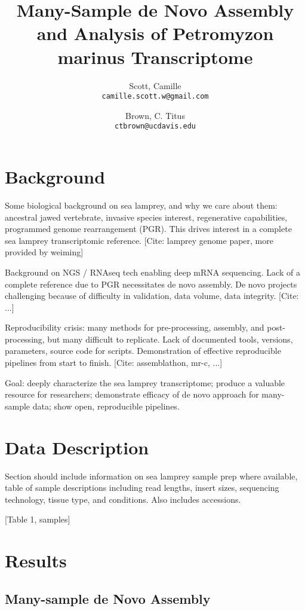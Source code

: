 \documentclass[10pt,twocolumn,linenumbers]{article}
\title{Many-Sample de Novo Assembly and Analysis of Petromyzon marinus Transcriptome}
\author{
    Scott, Camille\\
    \texttt{camille.scott.w@gmail.com}   %
    \and
    Brown, C. Titus\\
    \texttt{ctbrown@ucdavis.edu}
}
\begin{document}
\maketitle

\section*{Background}

Some biological background on sea lamprey, and why we care about them: ancestral jawed vertebrate, 
invasive species interest, regenerative capabilities, programmed genome rearrangement (PGR). This 
drives interest in a complete sea lamprey transcriptomic reference. [Cite: lamprey genome paper, 
more provided by weiming]

Background on NGS / RNAseq tech enabling deep mRNA sequencing. Lack of a complete reference due 
to PGR necessitates de novo assembly. De novo projects challenging because of difficulty in 
validation, data volume, data integrity. [Cite: ...]

Reproducibility crisis: many methods for pre-processing, assembly, and post-processing, but many 
difficult to replicate. Lack of documented tools, versions, parameters, source code for scripts. 
Demonstration of effective reproducible pipelines from start to finish. [Cite: assemblathon, mr-c, ...]

Goal: deeply characterize the sea lamprey transcriptome; produce a valuable resource for researchers; 
demonstrate efficacy of de novo approach for many-sample data; show open, reproducible pipelines.

\section*{Data Description}

Section should include information on sea lamprey sample prep where available, table of sample 
descriptions including read lengths, insert sizes, sequencing technology, tissue type, and conditions. 
Also includes accessions.

[Table 1, samples]

\section*{Results}

\subsection*{Many-sample de Novo Assembly}
\end{document}
